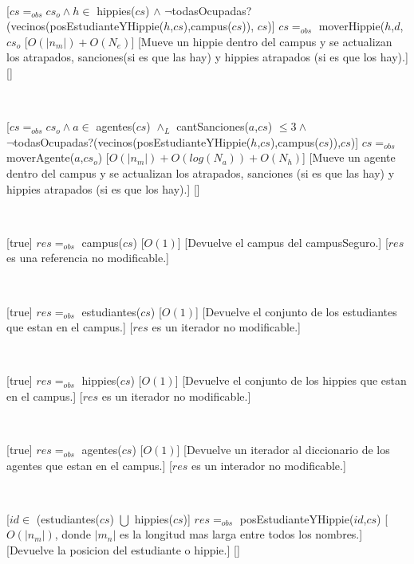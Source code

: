 ~

[$cs =_{obs} cs_o \land h \in$ hippies($cs$) $\land$ $\neg$todasOcupadas?(vecinos(posEstudianteYHippie($h$,$cs$),campus($cs$)), $cs$)]
{$cs =_{obs}$ moverHippie($h$,$d$,$cs_o$}
[$O(|n_m|) + O(N_e)$]
[Mueve un hippie dentro del campus y se actualizan los atrapados, sanciones(si es que las hay) y hippies atrapados (si es que los hay).]
[]

~

[$cs =_{obs} cs_o \land a \in$ agentes($cs$) $\land_L$ cantSanciones($a$,$cs$) $\leq 3 \land$ \\
$\neg$todasOcupadas?(vecinos(posEstudianteYHippie($h$,$cs$),campus($cs$)),$cs$)]
{$cs =_{obs}$ moverAgente($a$,$cs_o$)}
[$O(|n_m|) + O(log(N_a)) + O(N_h)$]
[Mueve un agente dentro del campus y se actualizan los atrapados, sanciones (si es que las hay) y hippies atrapados (si es que los hay).]
[]

~

[true]
{$res =_{obs}$ campus($cs$)}
[$O(1)$]
[Devuelve el campus del campusSeguro.]
[$res$ es una referencia no modificable.]

~

[true]
{$res =_{obs}$ estudiantes($cs$)}
[$O(1)$]
[Devuelve el conjunto de los estudiantes que estan en el campus.]
[$res$ es un iterador no modificable.]

~

[true]
{$res =_{obs}$ hippies($cs$)}
[$O(1)$]
[Devuelve el conjunto de los hippies que estan en el campus.]
[$res$ es un iterador no modificable.]

~

[true]
{$res =_{obs}$ agentes($cs$)}
[$O(1)$]
[Devuelve un iterador al diccionario de los agentes que estan en el campus.]
[$res$ es un interador no modificable.]

~

[$id \in$ (estudiantes($cs$) $\bigcup$ hippies($cs$)]
{$res =_{obs}$ posEstudianteYHippie($id$,$cs$)}
[$O(|n_m|)$, donde $|m_n|$ es la longitud mas larga entre todos los nombres.]
[Devuelve la posicion del estudiante o hippie.]
[]

